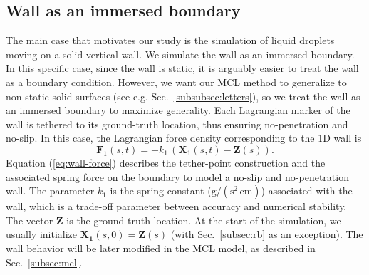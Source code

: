 \documentclass[%
 aip,
 amsmath,amssymb,
 reprint,
 floatfix
]{revtex4-1}
\begin{document}
\subsection{Wall as an immersed boundary} \label{subsec:wall}
The main case that motivates our study is the simulation of liquid droplets moving on a solid vertical wall. We simulate the wall as an immersed boundary. In this specific case, since the wall is static, it is arguably easier to treat the wall as a boundary condition. However, we want our MCL method to generalize to non-static solid surfaces (see e.g. Sec.~\ref{subsubsec:letters}), so we treat the wall as an immersed boundary to maximize generality. Each Lagrangian marker of the wall is tethered to its ground-truth location, thus ensuring no-penetration and no-slip. In this case, the Lagrangian force density corresponding to the 1D wall is
\begin{equation}
\bm{F}_1(s,t) = -k_1 \, (
    \bm{X}_1(s,t) - \bm{Z}(s)
). 
\label{eq:wall-force}
\end{equation}
Equation (\ref{eq:wall-force}) describes the tether-point construction and the associated spring force on the boundary to model a no-slip and no-penetration wall. The parameter $k_1$ is the spring constant ($\text{g}/(\text{s}^2\,\text{cm})$) associated with the wall, which is a trade-off parameter between accuracy and numerical stability. The vector $\boldsymbol{Z}$ is the ground-truth location. At the start of the simulation, we usually initialize $\boldsymbol{X_1}(s,0) = \boldsymbol{Z}(s)$ (with Sec.~\ref{subsec:rb} as an exception). The wall behavior will be later modified in the MCL model, as described in Sec.~\ref{subsec:mcl}. 
\end{document}
